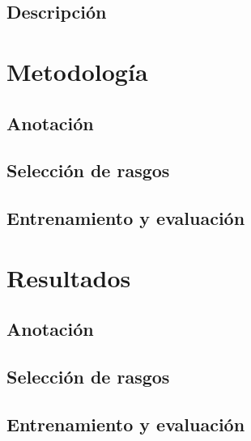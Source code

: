 \documentclass[colorinlistoftodos]{article}
\begin{document}
\subsection{Descripci\'on}\label{subsection-data-description}



\section{Metodolog\'ia}\label{section-methods}

\subsection{Anotaci\'on}\label{subsection-methods-annotation}


\subsection{Selecci\'on de rasgos}\label{subsection-methods-features}


\subsection{Entrenamiento y evaluaci\'on}\label{subsection-methods-models}


\section{Resultados}\label{section-results}

\subsection{Anotaci\'on}\label{subsec-results-annotation}


\subsection{Selecci\'on de rasgos}\label{subsection-results-features}


\subsection{Entrenamiento y evaluaci\'on}\label{subsection-results-models}

\end{document}
